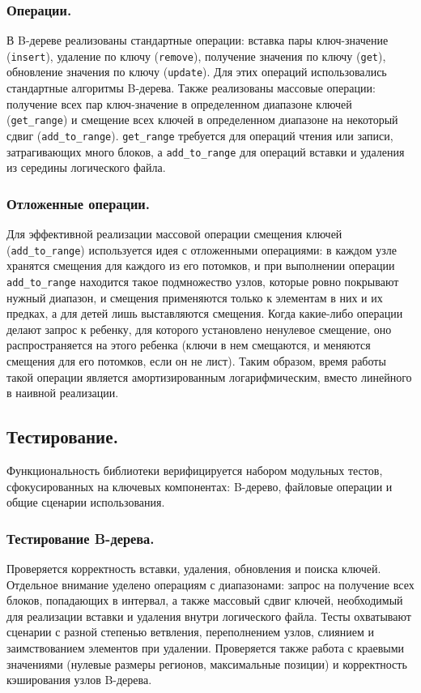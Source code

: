 \subsubsection{Операции.}
В B-дереве реализованы стандартные операции: вставка пары ключ-значение (\texttt{insert}), удаление по ключу (\texttt{remove}), получение значения по ключу (\texttt{get}), обновление значения по ключу (\texttt{update}). Для этих операций использовались стандартные алгоритмы B-дерева. Также реализованы массовые операции: получение всех пар ключ-значение в определенном диапазоне ключей (\texttt{get\_range}) и смещение всех ключей в определенном диапазоне на некоторый сдвиг (\texttt{add\_to\_range}). \texttt{get\_range} требуется для операций чтения или записи, затрагивающих много блоков, а \texttt{add\_to\_range} для операций вставки и удаления из середины логического файла.

\subsubsection{Отложенные операции.}
Для эффективной реализации массовой операции смещения ключей (\texttt{add\_to\_range}) используется идея с отложенными операциями: в каждом узле хранятся смещения для каждого из его потомков, и при выполнении операции \texttt{add\_to\_range} находится такое подмножество узлов, которые ровно покрывают нужный диапазон, и смещения применяются только к элементам в них и их предках, а для детей лишь выставляются смещения. Когда какие-либо операции делают запрос к ребенку, для которого установлено ненулевое смещение, оно распространяется на этого ребенка (ключи в нем смещаются, и меняются смещения для его потомков, если он не лист). Таким образом, время работы такой операции является амортизированным логарифмическим, вместо линейного в наивной реализации.

\subsection{Тестирование.}

Функциональность библиотеки верифицируется набором модульных тестов, сфокусированных на ключевых компонентах: B-дерево, файловые операции и общие сценарии использования.

\subsubsection{Тестирование B-дерева.}
Проверяется корректность вставки, удаления, обновления и поиска ключей. Отдельное внимание уделено операциям с диапазонами: запрос на получение всех блоков, попадающих в интервал, а также массовый сдвиг ключей, необходимый для реализации вставки и удаления внутри логического файла. Тесты охватывают сценарии с разной степенью ветвления, переполнением узлов, слиянием и заимствованием элементов при удалении. Проверяется также работа с краевыми значениями (нулевые размеры регионов, максимальные позиции) и корректность кэширования узлов B-дерева.

